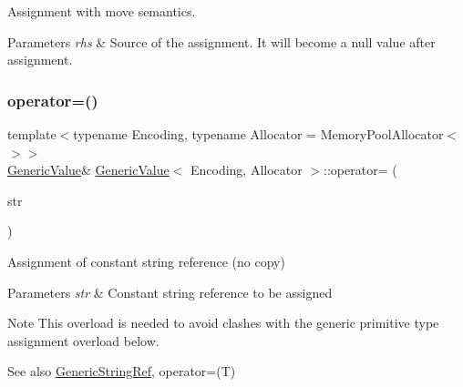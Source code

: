 Assignment with move semantics. 


\begin{DoxyParams}{Parameters}
{\em rhs} & Source of the assignment. It will become a null value after assignment. \\
\hline
\end{DoxyParams}
\mbox{\label{a01992_a386708557555e6389184de608af5e6a6}} 
\subsubsection{\texorpdfstring{operator=()}{operator=()}\hspace{0.1cm}{\footnotesize\ttfamily [2/2]}}
{\footnotesize\ttfamily template$<$typename Encoding, typename Allocator = Memory\+Pool\+Allocator$<$$>$$>$ \\
\hyperlink{a01992}{Generic\+Value}\& \hyperlink{a01992}{Generic\+Value}$<$ Encoding, Allocator $>$\+::operator= (\begin{DoxyParamCaption}\item[{\hyperlink{a01992_a32e0f30ee278072374c8168b14d3317f}{String\+Ref\+Type}}]{str }\end{DoxyParamCaption})\hspace{0.3cm}{\ttfamily [inline]}}



Assignment of constant string reference (no copy) 


\begin{DoxyParams}{Parameters}
{\em str} & Constant string reference to be assigned \\
\hline
\end{DoxyParams}
\begin{DoxyNote}{Note}
This overload is needed to avoid clashes with the generic primitive type assignment overload below. 
\end{DoxyNote}
\begin{DoxySeeAlso}{See also}
\hyperlink{a02008}{Generic\+String\+Ref}, operator=(\+T) 
\end{DoxySeeAlso}
\mbox{\label{a01992_a4a4418a93777942e1fb7ea71f8aaf680}} 
